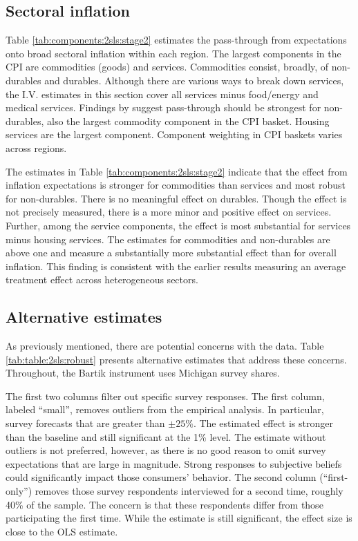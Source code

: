 \documentclass[12pt]{article}
\begin{document}


\subsection{Sectoral inflation}

Table \ref{tab:components:2sls:stage2} estimates the pass-through from expectations onto broad sectoral inflation within each region. The largest components in the CPI are commodities (goods) and services. Commodities consist, broadly, of non-durables and durables. Although there are various ways to break down services, the I.V. estimates in this section cover all services minus food/energy and medical services. Findings by \cite{Dacunto:groceryJPE} suggest pass-through should be strongest for non-durables, also the largest commodity component in the CPI basket. Housing services are the largest component. Component weighting in CPI baskets varies across regions.



The estimates in Table \ref{tab:components:2sls:stage2} indicate that the effect from inflation expectations is stronger for commodities than services and most robust for non-durables. There is no meaningful effect on durables. Though the effect is not precisely measured, there is a more minor and positive effect on services. Further, among the service components, the effect is most substantial for services minus housing services. The estimates for commodities and non-durables are above one and measure a substantially more substantial effect than for overall inflation. This finding is consistent with the earlier results measuring an average treatment effect across heterogeneous sectors.
\subsection{Alternative estimates}

As previously mentioned, there are potential concerns with the data. Table \ref{tab:table:2sls:robust} presents alternative estimates that address these concerns. Throughout, the Bartik instrument uses Michigan survey shares.




The first two columns filter out specific survey responses. The first column, labeled ``small'', removes outliers from the empirical analysis. In particular, survey forecasts that are greater than $\pm 25\%$. The estimated effect is stronger than the baseline and still significant at the 1\% level. The estimate without outliers is not preferred, however, as there is no good reason to omit survey expectations that are large in magnitude. Strong responses to subjective beliefs could significantly impact those consumers' behavior. The second column (``first-only'') removes those survey respondents interviewed for a second time, roughly 40\% of the sample. The concern is that these respondents differ from those participating the first time. While the estimate is still significant, the effect size is close to the OLS estimate.
\end{document}
